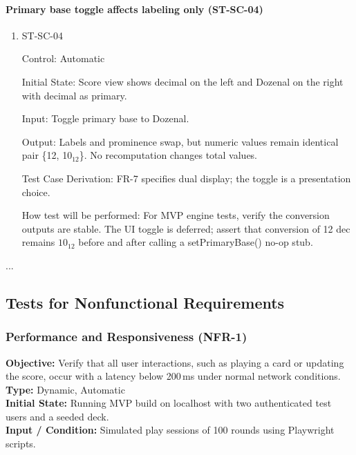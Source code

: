 \documentclass[12pt, titlepage]{article}
\begin{document}
\paragraph{Primary base toggle affects labeling only (ST-SC-04)}

\begin{enumerate}
\item{ST-SC-04\\}

Control: Automatic
					
Initial State: Score view shows decimal on the left and Dozenal on the right with decimal as primary.
					
Input: Toggle primary base to Dozenal.
					
Output: Labels and prominence swap, but numeric values remain identical pair \{12, 10$_{12}$\}. No recomputation changes total values.

Test Case Derivation: FR-7 specifies dual display; the toggle is a presentation choice.

How test will be performed: For MVP engine tests, verify the conversion outputs are stable. The UI toggle is deferred; assert that conversion of 12 dec remains $10_{12}$ before and after calling a setPrimaryBase() no-op stub.
\end{enumerate}



...

\subsection{Tests for Nonfunctional Requirements}

    \subsubsection{Performance and Responsiveness (NFR-1)}
    \textbf{Objective:} Verify that all user interactions, such as playing a card or updating the score, occur with a latency below 200\,ms under normal network conditions. \\

    \textbf{Type:} Dynamic, Automatic \\

    \textbf{Initial State:} Running MVP build on localhost with two authenticated test users and a seeded deck. \\

    \textbf{Input / Condition:} Simulated play sessions of 100 rounds using Playwright scripts. \\
\end{document}
